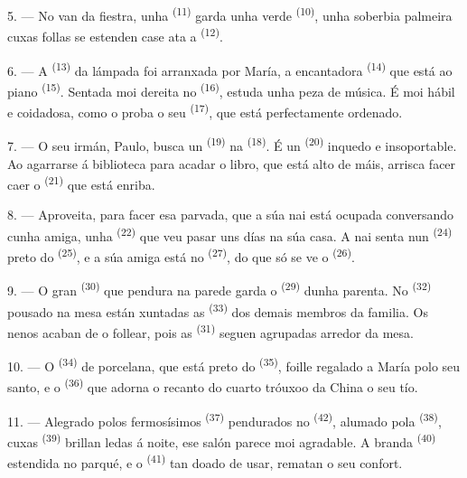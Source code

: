 5. --- No van da fiestra, unha  \textsuperscript{(11)} garda unha
 verde \textsuperscript{(10)}, unha soberbia palmeira cuxas follas se
estenden case ata a  \textsuperscript{(12)}.

6. --- A  \textsuperscript{(13)} da lámpada foi arranxada por María, a
encantadora  \textsuperscript{(14)} que está ao piano \textsuperscript{(15)}.
Sentada moi dereita no  \textsuperscript{(16)}, estuda unha peza de música. É
moi hábil e coidadosa, como o proba o seu  \textsuperscript{(17)},
que está perfectamente ordenado.

\VUsaut{5.0mm}
\VUsaut{3.0mm}

7. --- O seu irmán, Paulo, busca un  \textsuperscript{(19)} na
 \textsuperscript{(18)}. É un 
\textsuperscript{(20)} inquedo e insoportable. Ao agarrarse á biblioteca para acadar o libro,
que está alto de máis, arrisca facer caer o  \textsuperscript{(21)} que está
enriba.

8. --- Aproveita, para facer esa parvada, que a súa nai está ocupada conversando cunha amiga,
unha  \textsuperscript{(22)} que veu pasar uns días na súa casa. A nai senta nun
 \textsuperscript{(24)} preto do  \textsuperscript{(25)}, e a súa
amiga está no  \textsuperscript{(27)}, do que só se ve o 
\textsuperscript{(26)}.

9. --- O gran  \textsuperscript{(30)} que pendura na parede garda o
 \textsuperscript{(29)} dunha parenta. No 
\textsuperscript{(32)} pousado na mesa están xuntadas as 
\textsuperscript{(33)} dos demais membros da familia. Os nenos acaban de o follear, pois as
 \textsuperscript{(31)} seguen agrupadas arredor da mesa.

10. --- O  \textsuperscript{(34)} de porcelana, que está preto do
 \textsuperscript{(35)}, foille regalado a María polo seu santo, e o
 \textsuperscript{(36)} que adorna o recanto do cuarto tróuxoo da China o seu
tío.

11. --- Alegrado polos fermosísimos  \textsuperscript{(37)} pendurados no
 \textsuperscript{(42)}, alumado pola 
\textsuperscript{(38)}, cuxas  \textsuperscript{(39)} brillan
ledas á noite, ese salón parece moi agradable. A branda
 \textsuperscript{(40)} estendida no parqué, e o  \textsuperscript{(41)} tan doado de usar, rematan o seu confort.

